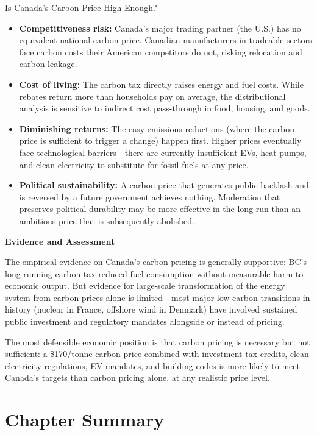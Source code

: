 \begin{policydebate}{Is Canada's Carbon Price High Enough?}
\begin{itemize}
  \item \textbf{Competitiveness risk:} Canada's major trading partner (the U.S.) has no equivalent national carbon price. Canadian manufacturers in tradeable sectors face carbon costs their American competitors do not, risking relocation and carbon leakage.
  \item \textbf{Cost of living:} The carbon tax directly raises energy and fuel costs. While rebates return more than households pay on average, the distributional analysis is sensitive to indirect cost pass-through in food, housing, and goods.
  \item \textbf{Diminishing returns:} The easy emissions reductions (where the carbon price is sufficient to trigger a change) happen first. Higher prices eventually face technological barriers---there are currently insufficient EVs, heat pumps, and clean electricity to substitute for fossil fuels at any price.
  \item \textbf{Political sustainability:} A carbon price that generates public backlash and is reversed by a future government achieves nothing. Moderation that preserves political durability may be more effective in the long run than an ambitious price that is subsequently abolished.
\end{itemize}

\textbf{Evidence and Assessment}

The empirical evidence on Canada's carbon pricing is generally supportive: BC's long-running carbon tax reduced fuel consumption without measurable harm to economic output. But evidence for large-scale transformation of the energy system from carbon prices alone is limited---most major low-carbon transitions in history (nuclear in France, offshore wind in Denmark) have involved sustained public investment and regulatory mandates alongside or instead of pricing.

The most defensible economic position is that carbon pricing is necessary but not sufficient: a \$170/tonne carbon price combined with investment tax credits, clean electricity regulations, EV mandates, and building codes is more likely to meet Canada's targets than carbon pricing alone, at any realistic price level.
\end{policydebate}

\section*{Chapter Summary}

